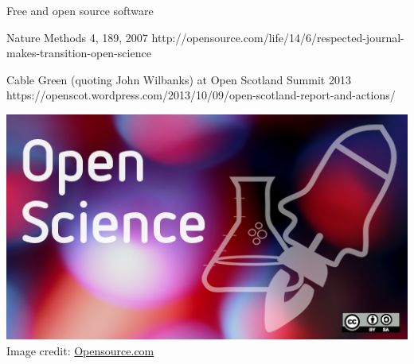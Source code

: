 \documentclass[xcolor={dvipsnames,usenames},beamer]{beamer}
\begin{document}
\begin{frame}{Free and open source software}

  {Nature Methods 4, 189, 2007}%
  {http://opensource.com/life/14/6/respected-journal-makes-transition-open-science}

%
  {Cable Green (quoting John Wilbanks) at Open Scotland Summit 2013}
  {https://openscot.wordpress.com/2013/10/09/open-scotland-report-and-actions/}

\bigskip
\bigskip

\centering
\includegraphics[height=0.4\textheight]{./images/general/open_science}%
\\
\tiny
Image credit: \href{https://opensource.com/}{Opensource.com}


\end{frame}


\newcommand{\coursesTitle}{Courses at North Carolina State University}
\end{document}
